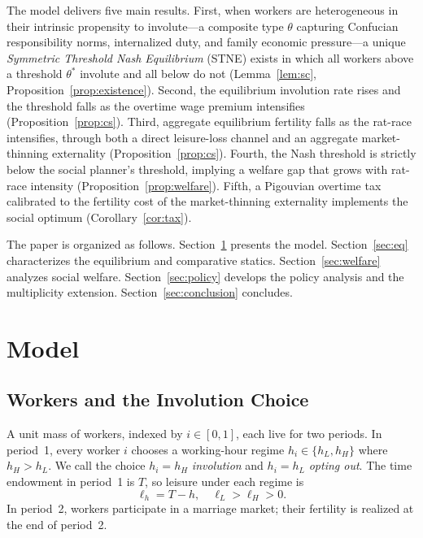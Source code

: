 \documentclass[12pt]{article}
\theoremstyle{plain}
\theoremstyle{definition}
\theoremstyle{remark}
\newcommand{\tstar}{\theta^{*}}
\newcommand{\hH}{h_{H}}
\newcommand{\hL}{h_{L}}
\begin{document}
The model delivers five main results.  First, when workers are heterogeneous in their
intrinsic propensity to involute---a composite type $\theta$ capturing Confucian
responsibility norms, internalized duty, and family economic pressure---a unique
\emph{Symmetric Threshold Nash Equilibrium} (STNE) exists in which all workers above
a threshold $\tstar$ involute and all below do not (Lemma~\ref{lem:sc},
Proposition~\ref{prop:existence}).  Second, the equilibrium involution rate rises and
the threshold falls as the overtime wage premium intensifies
(Proposition~\ref{prop:cs}).  Third, aggregate equilibrium fertility falls as the
rat-race intensifies, through both a direct leisure-loss channel and an aggregate
market-thinning externality (Proposition~\ref{prop:cs}).  Fourth, the Nash threshold
is strictly below the social planner's threshold, implying a welfare gap that grows
with rat-race intensity (Proposition~\ref{prop:welfare}).  Fifth, a Pigouvian
overtime tax calibrated to the fertility cost of the market-thinning externality
implements the social optimum (Corollary~\ref{cor:tax}).

The paper is organized as follows.  Section~\ref{sec:model} presents the model.
Section~\ref{sec:eq} characterizes the equilibrium and comparative statics.
Section~\ref{sec:welfare} analyzes social welfare.  Section~\ref{sec:policy} develops
the policy analysis and the multiplicity extension.  Section~\ref{sec:conclusion}
concludes.

\section{Model}
\label{sec:model}

\subsection{Workers and the Involution Choice}

A unit mass of workers, indexed by $i \in [0,1]$, each live for two periods.
In period~1, every worker $i$ chooses a working-hour regime
$h_{i} \in \{\hL, \hH\}$ where $\hH > \hL$.  We call the choice $h_{i} = \hH$
\emph{involution} and $h_{i} = \hL$ \emph{opting out}.  The time endowment in
period~1 is $T$, so leisure under each regime is
\begin{equation}
  \ell_{h} = T - h, \quad \ell_L > \ell_H > 0.
  \label{eq:leisure}
\end{equation}
In period~2, workers participate in a marriage market; their fertility is realized
at the end of period~2.
\end{document}
